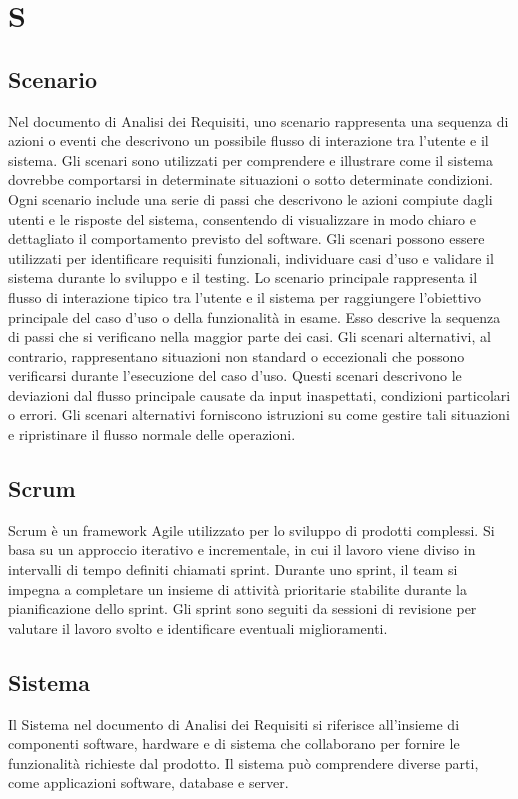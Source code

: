 \section{S} 
\subsection{Scenario} 
Nel documento di Analisi dei Requisiti, uno scenario rappresenta una sequenza di azioni o eventi che descrivono un possibile flusso di interazione tra l'utente e il sistema. Gli scenari sono utilizzati per comprendere e illustrare come il sistema dovrebbe comportarsi in determinate situazioni o sotto determinate condizioni. Ogni scenario include una serie di passi che descrivono le azioni compiute dagli utenti e le risposte del sistema, consentendo di visualizzare in modo chiaro e dettagliato il comportamento previsto del software. Gli scenari possono essere utilizzati per identificare requisiti funzionali, individuare casi d'uso e validare il sistema durante lo sviluppo e il testing. Lo scenario principale rappresenta il flusso di interazione tipico tra l'utente e il sistema per raggiungere l'obiettivo principale del caso d'uso o della funzionalità in esame. Esso descrive la sequenza di passi che si verificano nella maggior parte dei casi. Gli scenari alternativi, al contrario, rappresentano situazioni non standard o eccezionali che possono verificarsi durante l'esecuzione del caso d'uso. Questi scenari descrivono le deviazioni dal flusso principale causate da input inaspettati, condizioni particolari o errori. Gli scenari alternativi forniscono istruzioni su come gestire tali situazioni e ripristinare il flusso normale delle operazioni.
\subsection{Scrum} 
Scrum è un framework Agile utilizzato per lo sviluppo di prodotti complessi. Si basa su un approccio iterativo e incrementale, in cui il lavoro viene diviso in intervalli di tempo definiti chiamati sprint. Durante uno sprint, il team si impegna a completare un insieme di attività prioritarie stabilite durante la pianificazione dello sprint. Gli sprint sono seguiti da sessioni di revisione per valutare il lavoro svolto e identificare eventuali miglioramenti. 
\subsection{Sistema} 
Il Sistema nel documento di Analisi dei Requisiti si riferisce all'insieme di componenti software, hardware e di sistema che collaborano per fornire le funzionalità richieste dal prodotto. Il sistema può comprendere diverse parti, come applicazioni software, database e server.
